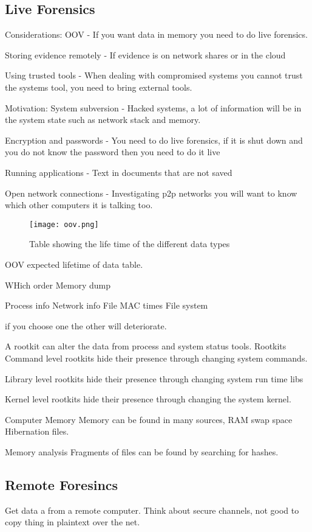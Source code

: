 \subsection{Live Forensics}
    Considerations:
        OOV - If you want data in memory you need to do live forensics.
        
        Storing evidence remotely - If evidence is on network shares or
        in the cloud

        Using trusted tools - When dealing with compromised systems you 
        cannot trust the systems tool, you need to bring external tools.

    Motivation:
        System subversion - Hacked systems, a lot of information will be
        in the system state such as network stack and memory.

        Encryption and passwords - You need to do live forensics, if it
        is shut down and you do not know the password then you need to do it
        live

        Running applications - Text in documents that are not saved

        Open network connections - Investigating p2p networks you will want
        to know which other computers it is talking too.

\begin{figure}[h]                                                                                                                 
    \centering\texttt{[image: oov.png]}
    \caption{Table showing the life time of the different data types}
\end{figure}

    OOV  expected lifetime of data table.

    WHich order
        Memory dump

        Process info
        Network info
        File MAC times
        File system

    if you choose one the other will deteriorate. 

    A rootkit can alter the data from process and system status tools.
    Rootkits
    Command level rootkits hide their presence through changing system
    commands.

    Library level rootkits hide their presence through changing system run time
    libs

    Kernel level rootkits hide their presence through changing the system
    kernel.

    Computer Memory
    Memory can be found in many sources, RAM swap space Hibernation files.

    Memory analysis
    Fragments of files can be found by searching for hashes.

\subsection{Remote Foresincs}
    Get data a from a remote computer.
    Think about secure channels, not good to copy thing in plaintext
    over the net.



